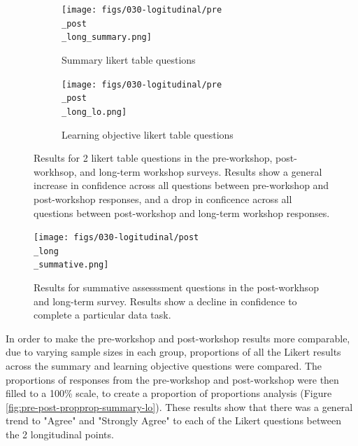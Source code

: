 \documentclass[030-workshop.tex]{subfiles}
\begin{document}
        \begin{figure}[htb]
            \centering
            \begin{subfigure}[h]{0.45\textwidth}
                \centering
                \texttt{[image: figs/030-logitudinal/pre\\\_post\\\_long\_summary.png]}
                \caption[Pre-Post-workshop and Long-term Survey for summary likert questions]
                {Summary likert table questions}
                \label{sfig:pre-post-long-summary}
            \end{subfigure}
            \hfill
            \begin{subfigure}[h]{0.45\textwidth}
                \centering
                \texttt{[image: figs/030-logitudinal/pre\\\_post\\\_long\_lo.png]}
                \caption[Pre-Post-workshop and Long-term Survey for learning objective likert questions]
                {Learning objective likert table questions}
                \label{sfig:pre-post-long-lo}
            \end{subfigure}
            \caption[Summary table and learning objective likert questions (pre, post, long-term)]
            {Results for 2 likert table questions in the
                pre-workshop, post-workhsop, and long-term workshop surveys.
                Results show a general increase in confidence across all questions between pre-workshop and post-workshop responses,
                and a drop in conficence across all questions between post-workshop and long-term workshop responses.
            }
            \label{fig:pre-post-long-summary-lo}
        \end{figure}

        \begin{figure}[htb]
            \centering
            \texttt{[image: figs/030-logitudinal/post\\\_long\\\_summative.png]}
            \caption[Summative assessment likert questions (post, long-term)]
            {Results for summative assesssment questions in the
                post-workhsop and long-term survey.
                Results show a decline in confidence to complete a particular data task.
            }
            \label{fig:post-long-summative}
        \end{figure}

        In order to make the pre-workshop and post-workshop results more comparable,
        due to varying sample sizes in each group,
        proportions of all the Likert results across the summary and learning objective questions were compared.
        The proportions of responses from the pre-workshop and post-workshop were then filled to a 100\% scale,
        to create a proportion of proportions analysis (Figure \ref{fig:pre-post-propprop-summary-lo}).
        These results show that there was a general trend to "Agree" and "Strongly Agree" to each of the Likert questions
        between the 2 longitudinal points.
\end{document}
